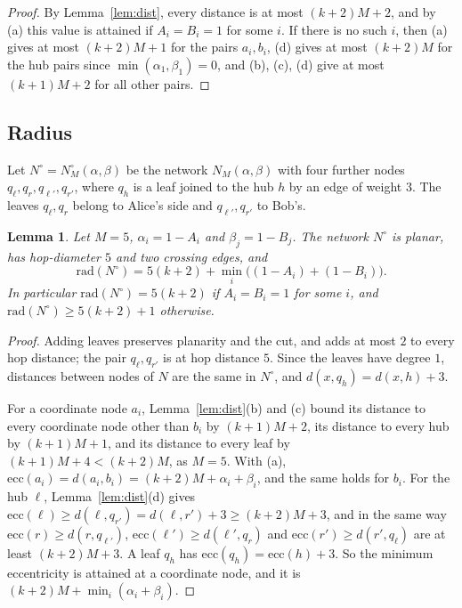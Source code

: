 \documentclass[11pt]{article}
\newtheorem{lemma}[theorem]{Lemma}
\theoremstyle{definition}
\theoremstyle{remark}
\newcommand{\ecc}{\mathrm{ecc}}
\newcommand{\rad}{\mathrm{rad}}
\begin{document}
\begin{proof}
By Lemma~\ref{lem:dist}, every distance is at most $(k+2)M+2$, and by (a) this value is attained if $A_i=B_i=1$ for some $i$. If there is no such $i$, then (a) gives at most $(k+2)M+1$ for the pairs $a_i,b_i$, (d) gives at most $(k+2)M$ for the hub pairs since $\min(\alpha_1,\beta_1)=0$, and (b), (c), (d) give at most $(k+1)M+2$ for all other pairs.
\end{proof}

\subsection{Radius}

Let $N^\circ=N^\circ_M(\alpha,\beta)$ be the network $N_M(\alpha,\beta)$ with four further nodes $q_\ell,q_r,q_{\ell'},q_{r'}$, where $q_h$ is a leaf joined to the hub $h$ by an edge of weight $3$. The leaves $q_\ell,q_r$ belong to Alice's side and $q_{\ell'},q_{r'}$ to Bob's.

\begin{lemma}\label{lem:radius}
Let $M=5$, $\alpha_i=1-A_i$ and $\beta_j=1-B_j$. The network $N^\circ$ is planar, has hop-diameter $5$ and two crossing edges, and
\[
\rad(N^\circ)=5(k+2)+\min_i\bigl((1-A_i)+(1-B_i)\bigr).
\]
In particular $\rad(N^\circ)=5(k+2)$ if $A_i=B_i=1$ for some $i$, and $\rad(N^\circ)\ge 5(k+2)+1$ otherwise.
\end{lemma}

\begin{proof}
Adding leaves preserves planarity and the cut, and adds at most $2$ to every hop distance; the pair $q_\ell,q_{r'}$ is at hop distance $5$. Since the leaves have degree $1$, distances between nodes of $N$ are the same in $N^\circ$, and $d(x,q_h)=d(x,h)+3$.

For a coordinate node $a_i$, Lemma~\ref{lem:dist}(b) and (c) bound its distance to every coordinate node other than $b_i$ by $(k+1)M+2$, its distance to every hub by $(k+1)M+1$, and its distance to every leaf by $(k+1)M+4<(k+2)M$, as $M=5$. With (a), $\ecc(a_i)=d(a_i,b_i)=(k+2)M+\alpha_i+\beta_i$, and the same holds for $b_i$. For the hub $\ell$, Lemma~\ref{lem:dist}(d) gives $\ecc(\ell)\ge d(\ell,q_{r'})=d(\ell,r')+3\ge(k+2)M+3$, and in the same way $\ecc(r)\ge d(r,q_{\ell'})$, $\ecc(\ell')\ge d(\ell',q_r)$ and $\ecc(r')\ge d(r',q_\ell)$ are at least $(k+2)M+3$. A leaf $q_h$ has $\ecc(q_h)=\ecc(h)+3$. So the minimum eccentricity is attained at a coordinate node, and it is $(k+2)M+\min_i(\alpha_i+\beta_i)$.
\end{proof}
\end{document}
